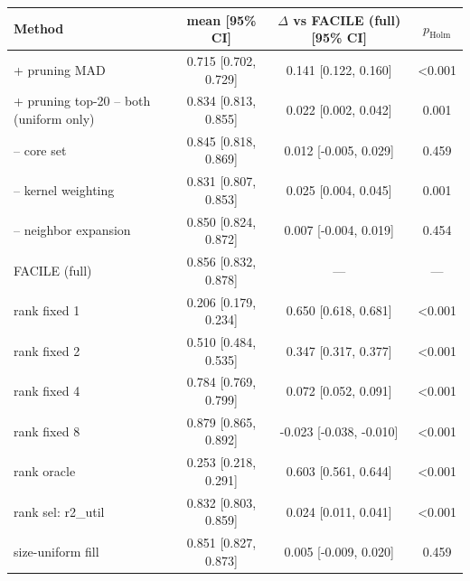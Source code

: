 \begin{tabular}{lccc}
\toprule
Method & mean [95\% CI] & $\Delta$ vs FACILE (full) [95\% CI] & $p_{\mathrm{Holm}}$ \\
\midrule
+ pruning MAD & 0.715 [0.702, 0.729] & 0.141 [0.122, 0.160] & <0.001 \\
+ pruning top-20%
-- both (uniform only) & 0.834 [0.813, 0.855] & 0.022 [0.002, 0.042] & 0.001 \\
-- core set & 0.845 [0.818, 0.869] & 0.012 [-0.005, 0.029] & 0.459 \\
-- kernel weighting & 0.831 [0.807, 0.853] & 0.025 [0.004, 0.045] & 0.001 \\
-- neighbor expansion & 0.850 [0.824, 0.872] & 0.007 [-0.004, 0.019] & 0.454 \\
FACILE (full) & 0.856 [0.832, 0.878] & --- & --- \\
rank fixed 1 & 0.206 [0.179, 0.234] & 0.650 [0.618, 0.681] & <0.001 \\
rank fixed 2 & 0.510 [0.484, 0.535] & 0.347 [0.317, 0.377] & <0.001 \\
rank fixed 4 & 0.784 [0.769, 0.799] & 0.072 [0.052, 0.091] & <0.001 \\
rank fixed 8 & 0.879 [0.865, 0.892] & -0.023 [-0.038, -0.010] & <0.001 \\
rank oracle & 0.253 [0.218, 0.291] & 0.603 [0.561, 0.644] & <0.001 \\
rank sel: r2_util & 0.832 [0.803, 0.859] & 0.024 [0.011, 0.041] & <0.001 \\
size-uniform fill & 0.851 [0.827, 0.873] & 0.005 [-0.009, 0.020] & 0.459 \\
\bottomrule
\end{tabular}

